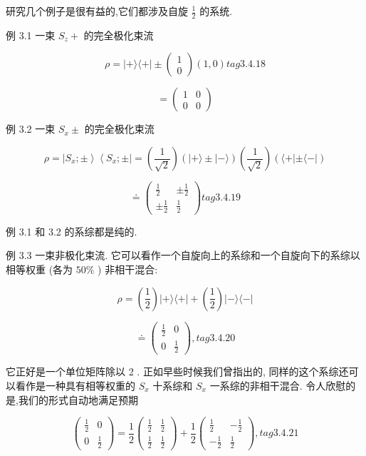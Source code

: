 研究几个例子是很有益的,它们都涉及自旋 $\frac{1}{2}$ 的系统.

例 3.1 一束 ${S}_{z} +$ 的完全极化束流

$$
\rho = \left| {+\rangle \langle + }\right| \pm \left( \begin{array}{l} 1 \\ 0 \end{array}\right) \left( {1,0}\right) tag{3. 4.18}
$$

$$
= \left( \begin{array}{ll} 1 & 0 \\ 0 & 0 \end{array}\right)
$$

例 3.2 一束 ${S}_{x} \pm$ 的完全极化束流

$$
\rho = \left| {{S}_{x}; \pm }\right\rangle \left\langle {{S}_{x}; \pm }\right| = \left( \frac{1}{\sqrt{2}}\right) \left( {\left| {+\rangle \pm }\right| - \rangle }\right) \left( \frac{1}{\sqrt{2}}\right) \left( {\langle + \left| {\pm \langle - }\right| }\right)
$$

$$
\doteq \left( \begin{matrix} \frac{1}{2} & \pm \frac{1}{2} \\ \pm \frac{1}{2} & \frac{1}{2} \end{matrix}\right) tag{3. 4.19}
$$

例 3.1 和 3.2 的系综都是纯的.

例 3.3 一束非极化束流. 它可以看作一个自旋向上的系综和一个自旋向下的系综以相等权重 (各为 ${50}\%$ ) 非相干混合:

$$
\rho = \left( \frac{1}{2}\right) \left| {+\rangle \langle + }\right| + \left( \frac{1}{2}\right) \left| {-\rangle \langle - }\right|
$$

$$
\doteq \left( \begin{array}{ll} \frac{1}{2} & 0 \\ 0 & \frac{1}{2} \end{array}\right) , tag{3. 4.20}
$$

它正好是一个单位矩阵除以 2 . 正如早些时候我们曾指出的, 同样的这个系综还可以看作是一种具有相等权重的 ${S}_{x}$ 十系综和 ${S}_{x}$ 一系综的非相干混合. 令人欣慰的是,我们的形式自动地满足预期

$$
\left( \begin{matrix} \frac{1}{2} & 0 \\ 0 & \frac{1}{2} \end{matrix}\right) = \frac{1}{2}\left( \begin{matrix} \frac{1}{2} & \frac{1}{2} \\ \frac{1}{2} & \frac{1}{2} \end{matrix}\right) + \frac{1}{2}\left( \begin{matrix} \frac{1}{2} & - \frac{1}{2} \\ - \frac{1}{2} & \frac{1}{2} \end{matrix}\right) , tag{3. 4.21}
$$

